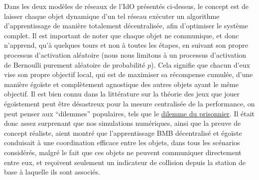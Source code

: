 \begin{resume_fr}
%
Dans les deux modèles de réseaux de l'IdO présentés ci-dessus, le concept est de laisser chaque objet dynamique d'un tel réseau exécuter un algorithme d'apprentissage de manière totalement décentralisée, afin d'optimiser le système complet.
Il est important de noter que chaque objet ne communique, et donc n'apprend, qu'à quelques tours et non à toutes les étapes, en suivant son propre processus d'activation aléatoire (nous nous limitons à un processus d'activation de Bernoulli purement aléatoire de probabilité $p$).
Cela signifie que chacun d'eux vise son propre objectif local, qui est de maximiser sa récompense cumulée, d'une manière égoïste et complètement agnostique des autres objets ayant le même objectif.
Il est bien connu dans la littérature sur la théorie des jeux que jouer égoïstement peut être désastreux pour la mesure centralisée de la performance, on peut penser aux ``dilemmes'' populaires, tels que le \href{https://fr.wikipedia.org/wiki/Dilemme_du_prisonnier}{dilemme du prisonnier}.
Il était donc assez surprenant que nos simulations numériques, ainsi que la preuve de concept réaliste, aient montré que l'apprentissage BMB décentralisé et égoïste conduisait à une coordination efficace entre les objets, dans tous les scénarios considérés, malgré le fait que ces objets ne peuvent communiquer directement entre eux, et reçoivent seulement un indicateur de collision depuis la station de base à laquelle ils sont associés.


\end{resume_fr}
